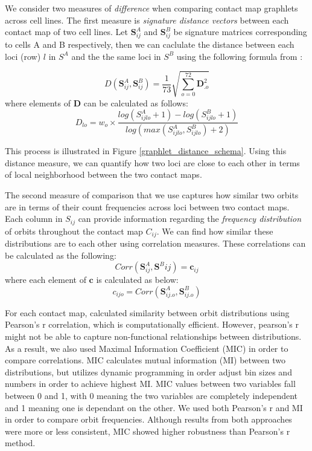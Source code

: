 \documentclass[a4,center,fleqn]{NAR}
\begin{document}
We consider two measures of \textit{difference} when comparing contact
map graphlets across cell lines. 
The first measure is \textit{signature distance vectors} between
each contact map of two cell lines. 
Let  $\mathbf{S}^A_{ij}$  and $\mathbf{S}^B_{ij}$ be
signature matrices corresponding  to cells A and B
respectively, then we can caclulate the 
distance between each
loci (row) $l$ in $S^A$ and the the same loci in $S^B$
using the following formula from \cite{prvzulj2007biological}:

\begin{equation}
    D(\mathbf{S}^A_{ij}, \mathbf{S}^B_{ij}) = 
    \frac{1}{73}\sqrt{\sum_{o=0}^{72}{\mathbf{D}_{.o}^2}}
    \label{eq:distance_total}
\end{equation}
where elements of $\mathbf{D}$ can be calculated as follows:
\begin{equation}
    D_{lo} = w_o \times 
        \frac{log(S_{ijlo}^A+1) - log(S_{ijlo}^B+1)}
             {log(max(S_{ijlo}^A, S_{ijlo}^B) + 2)}
    \label{eq:distance_single}
\end{equation}

This process is illustrated in Figure \ref{graphlet_distance_schema}.
Using this distance measure, we can quantify how two loci are close to
each other in terms of local neighborhood between the two contact maps.

The second measure of comparison that we use captures how 
similar two orbits are in terms of their count 
frequencies across loci between two contact maps. 
Each column in $S_{ij}$ can provide information
regarding the \textit{frequency distribution} of orbits throughout
the contact map $C_{ij}$. 
We can find how similar these distributions are to each other using
correlation measures.
These correlations can be calculated as the following:
\begin{equation}
    Corr(\mathbf{S}^A_{ij}, \mathbf{S}^B{ij}) = \mathbf{c}_{ij}
    \label{eq:correlation}
\end{equation}
where each element of $\mathbf{c}$ is calculated as below:
\begin{equation}
    c_{ijo} = Corr(\mathbf{S}^A_{ij.o}, \mathbf{S}^B_{ij.o})
    \label{eq:correlation}
\end{equation}

For each contact map,  calculated
similarity between orbit distributions using Pearson's r 
correlation, which is computationally efficient.
However, pearson's r might not be able to capture
non-functional relationships between distributions. As a result, we
also used Maximal Information Coefficient (MIC) 
\cite{reshef2011detecting} in order to compare
correlations. MIC calculates mutual information (MI) between two
distributions, but utilizes dynamic programming in order adjust
bin sizes and numbers in order to achieve highest MI.
MIC values between two variables fall between 0 and 1,
with 0 meaning the two variables are completely independent
and 1 meaning one is dependant on the other.
We used both Pearson's r and MI in order to compare orbit
frequencies. Although results from both approaches were more
or less consistent, MIC showed higher robustness than Pearson's 
r method.
\end{document}
